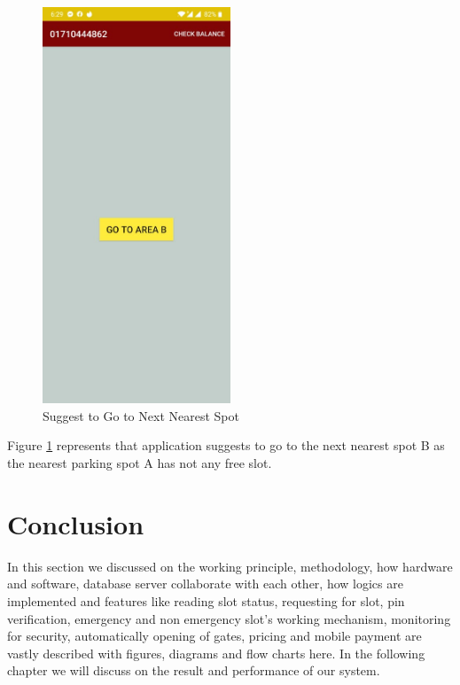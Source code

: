 \begin{figure}[H]
\centering
\includegraphics[width=0.5\textwidth]{figures/go2areab.jpg}
\caption{Suggest to Go to Next Nearest Spot}
\label{goto}
\end{figure}
Figure \ref{goto} represents that application suggests to go to the next nearest spot B as the nearest parking spot A has not any free slot.

\section{Conclusion}
In this section we discussed on the working principle, methodology, how hardware and software, database server collaborate with each other, how logics are implemented and features like reading slot status, requesting for slot, pin verification, emergency and non emergency slot's working mechanism, monitoring for security, automatically opening of gates, pricing and mobile payment are vastly described with figures, diagrams and flow charts here. In the following chapter we will discuss on the result and performance of our system. 
